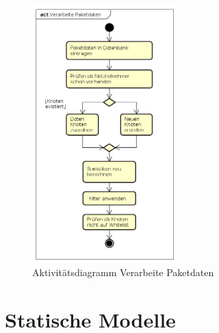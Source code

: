     \begin{figure}[h!]
        \centering
        \includegraphics[width=0.5\textwidth]{../diagrams/AD_Verarbeite_Paketdaten}
        \caption{Aktivitätsdiagramm Verarbeite Paketdaten}
    \end{figure}

\section{Statische Modelle}

